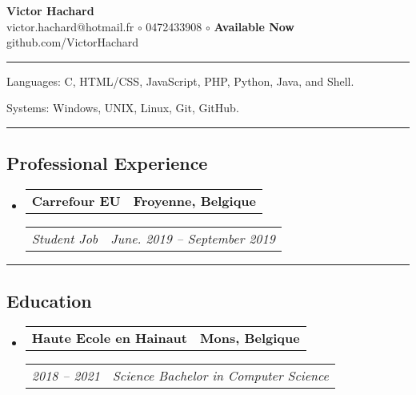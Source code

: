 \documentclass[10pt,letterpaper]{article}
\makeatletter
\newenvironment{indentsection}[1]
{\begin{list}{}
  {\setlength{\leftmargin}{#1}} \item[]
}
{\end{list}}
\newcommand{\headerrow}[2]
{\begin{tabular*}{\linewidth}{l@{\extracolsep{\fill}}r}
  #1 &
  #2 \\
\end{tabular*}}
\makeatother
\begin{document}
\begin{center}
  \huge \textbf{Victor Hachard} \\
  \large
  victor.hachard@hotmail.fr
  $\circ$
  0472433908
  $\circ$
  {\bf Available Now}
  \\
  github.com/VictorHachard
  \vspace{-0.2em}
\end{center}


\hrule
\begin{indentsection}{\parindent}
\begin{description*}
  \item[Languages:] C, HTML/CSS, JavaScript, PHP, Python, Java, and Shell.
  \item[Systems:] Windows, UNIX, Linux, Git, GitHub.
\end{description*}
\end{indentsection}


\hrule
\vspace{-0.4em}
\subsection*{Professional Experience}
\begin{itemize}
  \parskip=0.1em

  \item
  \headerrow
    {\textbf{Carrefour EU}}
    {\textbf{Froyenne, Belgique}}
  \headerrow
    {\emph{Student Job}}
    {\emph{June. 2019 -- September 2019}}

  \end{itemize}


\hrule
\vspace{-0.4em}
\subsection*{Education}
\begin{itemize}
  \parskip=0.1em

  \item
  \headerrow
    {\textbf{Haute Ecole en Hainaut}}
    {\textbf{Mons, Belgique}}
  \headerrow
    {\emph{2018 -- 2021}}
    {\emph{Science Bachelor in Computer Science}}
\end{itemize}
\end{document}
